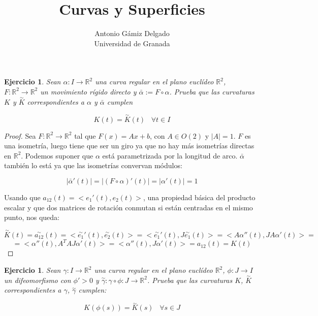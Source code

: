 \documentclass[12pt]{article}
\newcommand{\R}{\mathbb{R}}
\newtheorem{ejercicio}[theorem]{Ejercicio}
\theoremstyle{definition}
\theoremstyle{remark}
\newcommand{\espacio}{\;\;\;}
\newcommand{\tilda}[1]{\overset{\sim}{ #1 }}
\newcommand{\funcion}[3]{ #1 : #2 \longrightarrow #3}
\begin{document}
\title{Curvas y Superficies}
\author{Antonio Gámiz Delgado\\ Universidad de Granada} 
 
\maketitle

\begin{ejercicio}
Sean $\alpha:I\longrightarrow \R^2$ una curva regular en el plano euclídeo $\R^2$, $F:\R^2\longrightarrow\R^2$ un movimiento rígido directo y $\bar{\alpha}:=F\circ\alpha$. Prueba que las curvaturas $K$ y $\overset{\sim}{K}$ correspondientes a $\alpha$ y $\bar{\alpha}$ cumplen 

\[
K(t)=\overset{\sim}{K}(t) \espacio \forall t \in I
\]
\end{ejercicio}

\begin{proof}

Sea $\funcion{F}{\R^2}{\R^2}$ tal que $F(x)=Ax+b$, con $A\in O(2)$ y $|A|=1$. $F$ es una isometría, luego tiene que ser un giro ya que no hay más isometrías directas en $\R^2$. Podemos suponer que $\alpha$ está parametrizada por la longitud de arco. $\bar{\alpha}$ también lo está ya que las isometrías convervan módulos:

\[
|\bar{\alpha}'(t)|=|(F\circ\alpha)'(t)|=|\alpha'(t)|=1
\]

Usando que $a_{12}(t)=<e_1'(t),e_2(t)>$, una propiedad básica del producto escalar y que dos matrices de rotación conmutan si están centradas en el mismo punto, nos queda:

\[
\tilda{K}(t)=\tilda{a_{12}}(t)=<\tilda{e_1}'(t),\tilda{e_2}(t)>=<\tilda{e_1}'(t),J\tilda{e_1}(t)>=<A\alpha''(t),JA\alpha'(t)>=
\]
\[
=<\alpha''(t),A^TAJ\alpha'(t)>=<\alpha''(t),J\alpha'(t)>=a_{12}(t)=K(t)
\]

\end{proof}

\begin{ejercicio}
Sean $\gamma:I\longrightarrow\R^2$ una curva regular en el plano euclídeo $\R^2$, $\phi:J\longrightarrow I$ un difeomorfismo con $\phi'>0$ y $\overset{\sim}{\gamma}:\gamma\circ\phi:J\longrightarrow\R^2$. Prueba que las curvaturas $K$, $\overset{\sim}{K}$ correspondientes a $\gamma$, $\overset{\sim}{\gamma}$ cumplen:

\[
K(\phi(s))=\overset{\sim}{K}(s) \espacio \forall s \in J
\]

\end{ejercicio}
\end{document}
